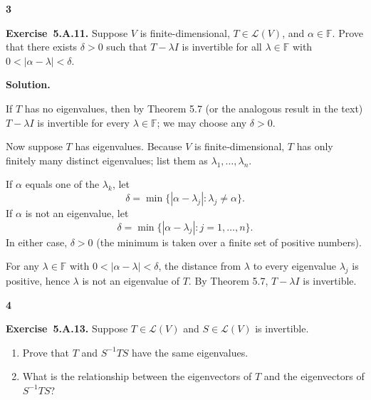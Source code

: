 \documentclass[11pt]{article}
\newcommand{\ProblemDivider}[1]{%
  \vspace{1.0em}
  \noindent\textbf{#1}\par
  \vspace{0.35em}
}
\newcommand{\ProblemAnnounce}{\noindent}
\newcommand{\SolutionAnnounce}{\noindent\textbf{Solution.}\par\medskip}
\newcommand{\Exercise}[1]{\textbf{Exercise~#1.}\;}
\newcommand{\F}{\mathbb{F}}
\newcommand{\Lmap}{\mathcal{L}}
\begin{document}
\ProblemDivider{3}

\begin{problemBox}
\ProblemAnnounce
\Exercise{5.A.11}
Suppose \(V\) is finite-dimensional, \(T \in \Lmap(V)\), and \(\alpha \in \F\). Prove that
there exists \(\delta > 0\) such that \(T - \lambda I\) is invertible for all \(\lambda \in \F\) with \(0 < |\alpha - \lambda| < \delta\).
\end{problemBox}

\begin{solutionBox}
\SolutionAnnounce
\doublespacing

If \(T\) has no eigenvalues, then by Theorem 5.7 (or the analogous result in the text) \(T - \lambda I\) is invertible for every \(\lambda \in \F\); we may choose any \(\delta > 0\).

Now suppose \(T\) has eigenvalues. Because \(V\) is finite‑dimensional, \(T\) has only finitely many distinct eigenvalues; list them as \(\lambda_1, \dots, \lambda_n\).

If \(\alpha\) equals one of the \(\lambda_k\), let
\[
\delta = \min\{|\alpha - \lambda_j| : \lambda_j \neq \alpha\}.
\]
If \(\alpha\) is not an eigenvalue, let
\[
\delta = \min\{|\alpha - \lambda_j| : j = 1,\dots,n\}.
\]
In either case, \(\delta > 0\) (the minimum is taken over a finite set of positive numbers).

For any \(\lambda \in \F\) with \(0 < |\alpha - \lambda| < \delta\), the distance from \(\lambda\) to every eigenvalue \(\lambda_j\) is positive, hence \(\lambda\) is not an eigenvalue of \(T\). By Theorem 5.7, \(T - \lambda I\) is invertible.

\end{solutionBox}

\ProblemDivider{4}

\begin{problemBox}
\ProblemAnnounce
\Exercise{5.A.13}
Suppose \(T \in \Lmap(V)\) and \(S \in \Lmap(V)\) is invertible.
\begin{enumerate}
  \item[(a)] Prove that \(T\) and \(S^{-1}TS\) have the same eigenvalues.
  \item[(b)] What is the relationship between the eigenvectors of \(T\) and the eigenvectors of \(S^{-1}TS\)?
\end{enumerate}
\end{problemBox}
\end{document}
